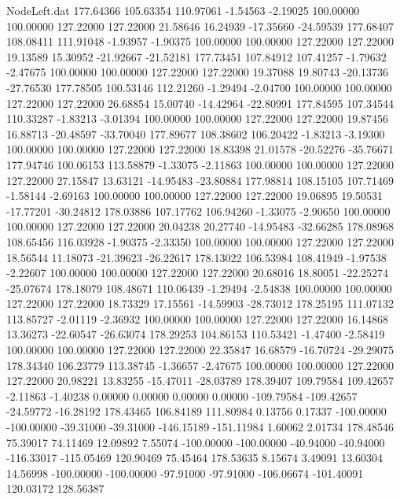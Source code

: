 \begin{filecontents}{NodeLeft.dat}
 177.64366  105.63354  110.97061    -1.54563   -2.19025  100.00000  100.00000  127.22000  127.22000   21.58646   16.24939  -17.35660  -24.59539
 177.68407  108.08411  111.91048    -1.93957   -1.90375  100.00000  100.00000  127.22000  127.22000   19.13589   15.30952  -21.92667  -21.52181
 177.73451  107.84912  107.41257    -1.79632   -2.47675  100.00000  100.00000  127.22000  127.22000   19.37088   19.80743  -20.13736  -27.76530
 177.78505  100.53146  112.21260    -1.29494   -2.04700  100.00000  100.00000  127.22000  127.22000   26.68854   15.00740  -14.42964  -22.80991
 177.84595  107.34544  110.33287    -1.83213   -3.01394  100.00000  100.00000  127.22000  127.22000   19.87456   16.88713  -20.48597  -33.70040
 177.89677  108.38602  106.20422    -1.83213   -3.19300  100.00000  100.00000  127.22000  127.22000   18.83398   21.01578  -20.52276  -35.76671
 177.94746  100.06153  113.58879    -1.33075   -2.11863  100.00000  100.00000  127.22000  127.22000   27.15847   13.63121  -14.95483  -23.80884
 177.98814  108.15105  107.71469    -1.58144   -2.69163  100.00000  100.00000  127.22000  127.22000   19.06895   19.50531  -17.77201  -30.24812
 178.03886  107.17762  106.94260    -1.33075   -2.90650  100.00000  100.00000  127.22000  127.22000   20.04238   20.27740  -14.95483  -32.66285
 178.08968  108.65456  116.03928    -1.90375   -2.33350  100.00000  100.00000  127.22000  127.22000   18.56544   11.18073  -21.39623  -26.22617
 178.13022  106.53984  108.41949    -1.97538   -2.22607  100.00000  100.00000  127.22000  127.22000   20.68016   18.80051  -22.25274  -25.07674
 178.18079  108.48671  110.06439    -1.29494   -2.54838  100.00000  100.00000  127.22000  127.22000   18.73329   17.15561  -14.59903  -28.73012
 178.25195  111.07132  113.85727    -2.01119   -2.36932  100.00000  100.00000  127.22000  127.22000   16.14868   13.36273  -22.60547  -26.63074
 178.29253  104.86153  110.53421    -1.47400   -2.58419  100.00000  100.00000  127.22000  127.22000   22.35847   16.68579  -16.70724  -29.29075
 178.34340  106.23779  113.38745    -1.36657   -2.47675  100.00000  100.00000  127.22000  127.22000   20.98221   13.83255  -15.47011  -28.03789
 178.39407  109.79584  109.42657    -2.11863   -1.40238    0.00000    0.00000    0.00000    0.00000 -109.79584 -109.42657  -24.59772  -16.28192
 178.43465  106.84189  111.80984     0.13756    0.17337 -100.00000 -100.00000  -39.31000  -39.31000 -146.15189 -151.11984    1.60062    2.01734
 178.48546   75.39017   74.11469    12.09892    7.55074 -100.00000 -100.00000  -40.94000  -40.94000 -116.33017 -115.05469  120.90469   75.45464
 178.53635    8.15674    3.49091    13.60304   14.56998 -100.00000 -100.00000  -97.91000  -97.91000 -106.06674 -101.40091  120.03172  128.56387

\end{filecontents}
